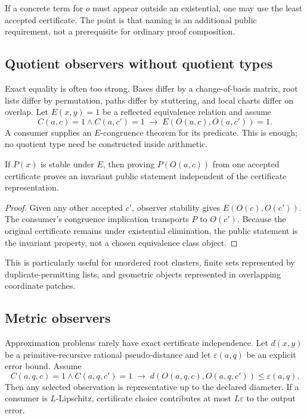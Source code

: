If a concrete term for \(o\) must appear outside an existential, one may use the
least accepted certificate.  The point is that naming is an additional public
requirement, not a prerequisite for ordinary proof composition.

\subsection{Quotient observers without quotient types}

Exact equality is often too strong.  Bases differ by a change-of-basis matrix,
root lists differ by permutation, paths differ by stuttering, and local charts
differ on overlap.  Let \(E(x,y)=1\) be a reflected equivalence relation and
assume
\[
 C(a,c)=1\wedge C(a,c')=1
 \;\longrightarrow\;
 E(O(a,c),O(a,c'))=1.
\]
A consumer supplies an \(E\)-congruence theorem for its predicate.  This is
enough; no quotient type need be constructed inside arithmetic.

\begin{proposition}
If \(P(x)\) is stable under \(E\), then proving \(P(O(a,c))\) from one accepted
certificate proves an invariant public statement independent of the
certificate representation.
\end{proposition}

\begin{proof}
Given any other accepted \(c'\), observer stability gives \(E(O(c),O(c'))\).
The consumer's congruence implication transports \(P\) to \(O(c')\).  Because
the original certificate remains under existential elimination, the public
statement is the invariant property, not a chosen equivalence class object.
\end{proof}

This is particularly useful for unordered root clusters, finite sets represented
by duplicate-permitting lists, and geometric objects represented in overlapping
coordinate patches.

\subsection{Metric observers}

Approximation problems rarely have exact certificate independence.  Let
\(d(x,y)\) be a primitive-recursive rational pseudo-distance and let
\(\varepsilon(a,q)\) be an explicit error bound.  Assume
\[
 C(a,q,c)=1\wedge C(a,q,c')=1
 \;\longrightarrow\;
 d(O(a,q,c),O(a,q,c'))\le\varepsilon(a,q).
\]
Then any selected observation is representative up to the declared diameter.
If a consumer is \(L\)-Lipschitz, certificate choice contributes at most
\(L\varepsilon\) to the output error.

